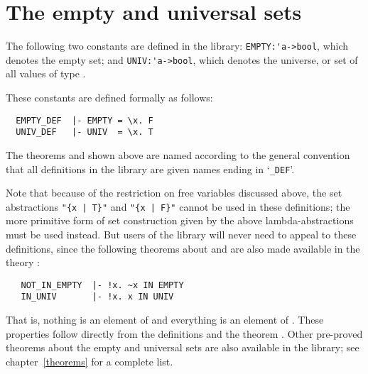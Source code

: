 \section{The empty and universal sets}

The following two constants are defined in the  library:
{\small\verb!EMPTY:'a->bool!}, which denotes the empty set; and
{\small\verb!UNIV:'a->bool!}, which denotes the universe, or set of all values
of type .{\samepage  These constants are defined formally as follows:

\begin{hol}
\begin{verbatim}
  EMPTY_DEF  |- EMPTY = \x. F
  UNIV_DEF   |- UNIV  = \x. T
\end{verbatim}\end{hol}

\noindent The theorems
 and  shown above are named according
to the general convention that all definitions in the  library
are given names ending
in `{\small\verb!_DEF!}'.}

\pagebreak[3]

Note that because of the restriction on free variables discussed above, the set
abstractions {\small\verb!"{x | T}"!} and {\small\verb!"{x | F}"!} cannot be
used in these definitions; the more primitive form of set construction given by
the above lambda-abstractions must be used instead.  But users of the library
will never need to appeal to these definitions, since the following theorems
about  and  are also made available in the theory
:

\begin{hol}
\begin{verbatim}
   NOT_IN_EMPTY  |- !x. ~x IN EMPTY
   IN_UNIV       |- !x. x IN UNIV
\end{verbatim}\end{hol}

\noindent That is, nothing is an element of  and everything is an
element of . These properties follow directly from the definitions and
the theorem .  Other pre-proved theorems about the empty and
universal sets are also available in the library; see chapter~\ref{theorems}
for a complete list.

